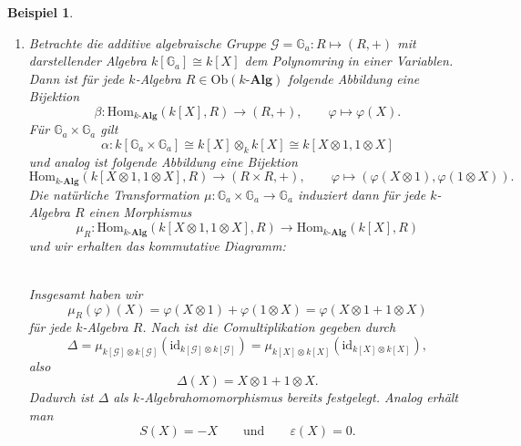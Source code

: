 \documentclass[a4paper, 11pt]{scrartcl}
\newcommand{\Hom}{\text{Hom}}
\newcommand{\id}{\text{id}}
\newcommand{\Ob}{\text{Ob}}
\theoremstyle{basicstyle}
\newtheorem{beispiel}[definition]{Beispiel}
\begin{document}
    \begin{beispiel}
        \begin{enumerate}
            \item Betrachte die additive algebraische Gruppe \(\mathcal{G} = \mathbb{G}_a : R \mapsto (R, +)\) mit darstellender Algebra \(k[\mathbb{G}_a] \cong k[X]\) dem Polynomring in einer Variablen.
                Dann ist für jede \(k\)-Algebra \(R \in \Ob(k\textbf{-Alg})\) folgende Abbildung eine Bijektion
                \[\beta: \Hom_{k\textbf{-Alg}}(k[X], R) \longrightarrow (R, +), \qquad \varphi \mapsto \varphi(X).\]
                Für \(\mathbb{G}_a \times \mathbb{G}_a\) gilt
                \[\alpha: k[\mathbb{G}_a \times \mathbb{G}_a] \cong k[X] \otimes_k k[X] \cong k[X \otimes 1, 1 \otimes X]\]
                und analog ist folgende Abbildung eine Bijektion
                \[\Hom_{k\textbf{-Alg}}(k[X \otimes 1, 1 \otimes X], R) \longrightarrow (R \times R, +), \qquad \varphi \mapsto (\varphi(X \otimes 1), \varphi(1 \otimes X)).\]
                Die natürliche Transformation \(\mu: \mathbb{G}_a \times \mathbb{G}_a \to \mathbb{G}_a\) induziert dann für jede \(k\)-Algebra \(R\) einen Morphismus
                \[\mu_R : \Hom_{k\textbf{-Alg}}(k[X \otimes 1, 1 \otimes X], R) \longrightarrow \Hom_{k\textbf{-Alg}}(k[X], R)\]
                und wir erhalten das kommutative Diagramm: 
                \begin{figure*}[ht!]
                    \centering
                \end{figure*} \\
                Insgesamt haben wir \[\mu_R(\varphi)(X) = \varphi(X \otimes 1) + \varphi(1 \otimes X) = \varphi(X \otimes 1 + 1 \otimes X)\]
                für jede \(k\)-Algebra \(R\).
                Nach  ist die Comultiplikation gegeben durch
                \[\Delta = \mu_{k[\mathcal{G}] \otimes k[\mathcal{G}]}(\id_{k[\mathcal{G}] \otimes k[\mathcal{G}]}) = \mu_{k[X] \otimes k[X]}(\id_{k[X] \otimes k[X]}),\]
                also \[\Delta(X) = X \otimes 1 + 1 \otimes X.\]
                Dadurch ist \(\Delta\) als \(k\)-Algebrahomomorphismus bereits festgelegt.
                Analog erhält man \[S(X) = -X \qquad\text{und}\qquad \varepsilon(X) = 0.\]


\end{enumerate}
\end{beispiel}
\end{document}
